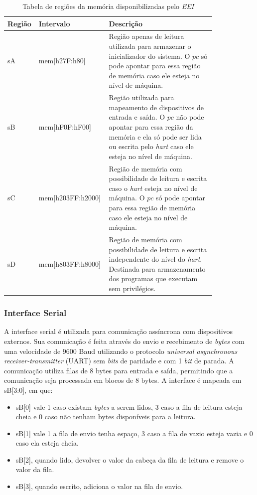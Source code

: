 \begin{table}
  \begin{tabular}{ |p{0.08\linewidth}|p{0.25\linewidth}|p{0.5\linewidth}| } 
    \hline
    Região & Intervalo & Descrição \\ \hline \hline
    sA & mem[h27F:h80] & Região apenas de leitura utilizada para armazenar o inicializador do sistema. 
    O $pc$ só pode apontar para essa região de memória caso ele esteja no nível de máquina. \\ \hline

    sB & mem[hF0F:hF00] & Região utilizada para mapeamento de dispositivos de entrada e saída. O $pc$ não pode apontar para essa região da memória
    e ela só pode ser lida ou escrita pelo \emph{hart} caso ele esteja no nível de máquina. \\ \hline

    sC & mem[h203FF:h2000] & Região de memória com possibilidade de leitura e escrita caso o \emph{hart} esteja no nível de máquina.
    O $pc$ só pode apontar para essa região de memória caso ele esteja no nível de máquina. \\ \hline

    sD & mem[h803FF:h8000] & Região de memória com possibilidade de leitura e escrita independente do nível do \emph{hart}.
    Destinada para armazenamento dos programas que executam sem privilégios. \\ \hline
  \end{tabular}
\caption{Tabela de regiões da memória disponibilizadas pelo \emph{EEI} \label{tab:memregions}}
\end{table}

\subsubsection{Interface Serial}
\label{ssec:serialio}

A interface serial é utilizada para comunicação assíncrona com dispositivos externos. Sua comunicação é feita através do envio e recebimento de \emph{bytes}
com uma velocidade de 9600 Baud utilizando o protocolo \emph{universal asynchronous receiver-transmitter} (UART) sem \emph{bits} de paridade e com 1 
\emph{bit} de parada. A comunicação utiliza filas de 8 bytes para entrada e saída, permitindo que a comunicação seja processada em blocos de 8 bytes.
A interface é mapeada em sB[3:0], em que:
\begin{itemize}
  \item sB[0] vale 1 caso existam \emph{bytes} a serem lidos, 3 caso a
        fila de leitura esteja cheia e 0 caso não tenham bytes disponíveis para a leitura.
  \item sB[1] vale 1 a fila de envio tenha espaço, 3 caso a fila de vazio esteja vazia e 0 caso ela esteja cheia.
  \item sB[2], quando lido, devolver o valor da cabeça da fila de leitura e remove o valor da fila.
  \item sB[3], quando escrito, adiciona o valor na fila de envio.
\end{itemize}

